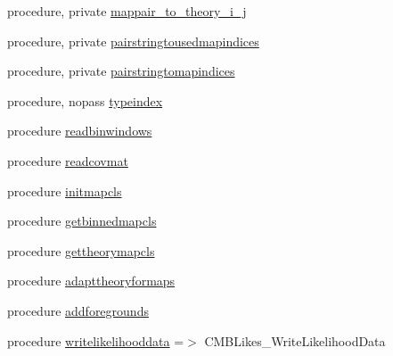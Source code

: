 \begin{DoxyCompactItemize}
procedure, private \mbox{\hyperlink{structcmblikes_1_1tcmblikes_acb104b9f6ebc3b14decb4766db326c5b}{mappair\+\_\+to\+\_\+theory\+\_\+i\+\_\+j}}
\item 
procedure, private \mbox{\hyperlink{structcmblikes_1_1tcmblikes_a69df309342f6b5d920f76a3c27d228cb}{pairstringtousedmapindices}}
\item 
procedure, private \mbox{\hyperlink{structcmblikes_1_1tcmblikes_ac173560276a249236377f3f642072c01}{pairstringtomapindices}}
\item 
procedure, nopass \mbox{\hyperlink{structcmblikes_1_1tcmblikes_a497ee63bcf197dae6bc56e30c75625d1}{typeindex}}
\item 
procedure \mbox{\hyperlink{structcmblikes_1_1tcmblikes_a4dad68a9e52ab523e7cbf1997c5fb06d}{readbinwindows}}
\item 
procedure \mbox{\hyperlink{structcmblikes_1_1tcmblikes_a6f4b94edd4d45a1612a334d1daeb2ae9}{readcovmat}}
\item 
procedure \mbox{\hyperlink{structcmblikes_1_1tcmblikes_a8015b57a7183e3097974fd5fea70fc53}{initmapcls}}
\item 
procedure \mbox{\hyperlink{structcmblikes_1_1tcmblikes_ae68b925244e8669bbb2f2aa191bcaf9e}{getbinnedmapcls}}
\item 
procedure \mbox{\hyperlink{structcmblikes_1_1tcmblikes_ad858e44079d62898a5bdf94da15470af}{gettheorymapcls}}
\item 
procedure \mbox{\hyperlink{structcmblikes_1_1tcmblikes_aa9b2d4b3dbc67ccf62e3688c2496a304}{adapttheoryformaps}}
\item 
procedure \mbox{\hyperlink{structcmblikes_1_1tcmblikes_aa346bb17529545a0115135a7c1dc677e}{addforegrounds}}
\item 
procedure \mbox{\hyperlink{structcmblikes_1_1tcmblikes_aa0ccc83dbf982800593b499700473ed3}{writelikelihooddata}} =$>$ C\+M\+B\+Likes\+\_\+\+Write\+Likelihood\+Data
\end{DoxyCompactItemize}
